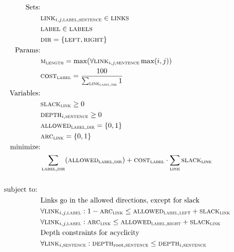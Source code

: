 \documentclass[11pt]{article}
\begin{document}
\begin{figure}
  \small
  \begin{align*}
    \text{Sets:}&&\\
    &\textsc{link}_{i,j,\textsc{label},\textsc{sentence}} \in \textsc{links} &\\
    &\textsc{label} \in \textsc{labels}&\\ 
    &\textsc{dir} = \{\textsc{left}, \textsc{right}\} &\\
    \text{Params:}&&\\
    &\textsc{m}_\textsc{length} = \max (\forall{\textsc{link}_{i,j,\textsc{sentence}}} \max(i,j)) &\\
    &\textsc{cost}_{\textsc{label}} = \frac{100}{ \sum_{\textsc{link}_{\textsc{label},\textsc{dir}}}1 } &\\
    \text{Variables:}&&\\
    &\textsc{slack}_{\textsc{link}} \geq 0 &\\ 
    &\textsc{depth}_{i,\textsc{sentence}} \geq 0 &\\
    &\textsc{allowed}_{\textsc{label},\textsc{dir}} = \{0,1\}&\\
    &\textsc{arc}_{\textsc{link}} = \{0,1\} &\\
    \text{minimize:}& &\\ 
    &\sum_{\textsc{label}, \textsc{dir}} (\textsc{allowed}_{\textsc{label},\textsc{dir}}) + \textsc{cost}_{\textsc{label}} \cdot \sum_\textsc{link} \textsc{slack}_{\textsc{link}} &\\
    &&\\
    \text{subject to: }& &\\
    &\text{Links go in the allowed directions, except for slack}&\\
    &\forall{\textsc{link}_{i,j,\textsc{label}}}: 1-\textsc{arc}_{\textsc{link}} \leq \textsc{allowed}_{\textsc{label}, \textsc{left}} + \textsc{slack}_{\textsc{link}} &\\
    &\forall{\textsc{link}_{i,j,\textsc{label}}}: \textsc{arc}_{\textsc{link}} \leq \textsc{allowed}_{\textsc{label}, \textsc{right}} + \textsc{slack}_{\textsc{link}} &\\
    &\text{Depth constraints for acyclicity}&\\
    &\forall{\textsc{link}_{i,\textsc{sentence}}}: \textsc{depth}_{\text{root},\textsc{sentence}} \leq \textsc{depth}_{i,\textsc{sentence}} &\\

\end{align*}
\end{figure}
\end{document}
